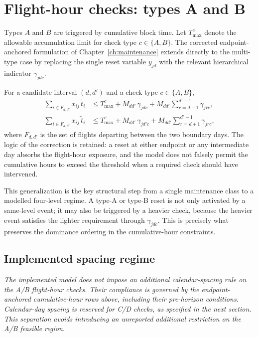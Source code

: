 \section{Flight-hour checks: types A and B}
\label{sec:hierarchy_ab}

Types $A$ and $B$ are triggered by cumulative block time. Let $T_{\max}^{c}$
denote the allowable accumulation limit for check type $c \in \{A,B\}$.
The corrected endpoint-anchored formulation of Chapter~\ref{ch:maintenance}
extends directly to the multi-type case by replacing the single reset variable
$y_{jd}$ with the relevant hierarchical indicator $\gamma_{jdc}$.

For a candidate interval $(d,d')$ and a check type $c \in \{A,B\}$,
\begin{align}
    \sum_{i \in F_{d,d'}} x_{ij}\,\tilde{t}_i
    &\leq T_{\max}^{c} + M_{dd'}\,\gamma_{jdc}
    + M_{dd'}\sum_{r=d+1}^{d'-1}\gamma_{jrc},
    \label{eq:c13a_hier} \\
    \sum_{i \in F_{d,d'}} x_{ij}\,\tilde{t}_i
    &\leq T_{\max}^{c} + M_{dd'}\,\gamma_{jd'c}
    + M_{dd'}\sum_{r=d+1}^{d'-1}\gamma_{jrc},
    \label{eq:c13b_hier}
\end{align}
where $F_{d,d'}$ is the set of flights departing between the two boundary days.
The logic of the correction is retained: a reset at either endpoint or any
intermediate day absorbs the flight-hour exposure, and the model does not
falsely permit the cumulative hours to exceed the threshold when a required check
should have intervened.

This generalization is the key structural step from a single maintenance class to
 a modelled four-level regime. A type-A or type-B reset is not only activated by a
 same-level event; it may also be triggered by a heavier check, because the
 heavier event satisfies the lighter requirement through $\gamma_{jdc}$. This is
 precisely what preserves the dominance ordering in the cumulative-hour
 constraints.

\subsection{Implemented spacing regime}

\textit{The implemented model does not impose an additional calendar-spacing
rule on the A/B flight-hour checks. Their compliance is governed by the
endpoint-anchored cumulative-hour rows above, including their pre-horizon
conditions. Calendar-day spacing is reserved for C/D checks, as specified in
the next section. This separation avoids introducing an unreported additional
restriction on the A/B feasible region.}

